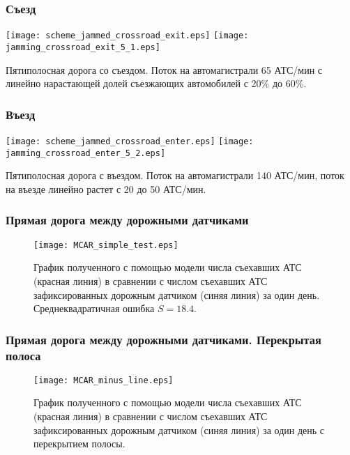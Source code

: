 \begin{frame}
    \frametitle{Съезд}
  \hfil\hfil\texttt{[image: scheme\_jammed\_crossroad\_exit.eps]}\newline
  \vfil
  \hfil\hfil\texttt{[image: jamming\_crossroad\_exit\_5\_1.eps]}\hfil\hfil
    \begin{minipage}[b][0.5\textheight][c]{.45\linewidth}
    Пятиполосная дорога со съездом. Поток на автомагистрали 65 АТС/мин с линейно нарастающей долей съезжающих автомобилей с 20\% до 60\%.
    \end{minipage}\newline
\end{frame}

\begin{frame}
    \frametitle{Въезд}
  \hfil\hfil\texttt{[image: scheme\_jammed\_crossroad\_enter.eps]}\newline
  \vfil
  \hfil\hfil\texttt{[image: jamming\_crossroad\_enter\_5\_2.eps]}\hfil\hfil
    \begin{minipage}[b][0.5\textheight][c]{.45\linewidth}
    Пятиполосная дорога с въездом. Поток на автомагистрали 140 АТС/мин, поток на въезде линейно растет с 20 до 50 АТС/мин.
    \end{minipage}\newline
\end{frame}

\begin{frame}
    \frametitle{Прямая дорога между дорожными датчиками}
    \begin{figure}[h]
        \centering
        \texttt{[image: MCAR\_simple\_test.eps]}
        \caption{График полученного с помощью модели числа съехавших АТС (красная линия) в сравнении с числом съехавших АТС зафиксированных дорожным датчиком (синяя линия) за один день. Среднеквадратичная ошибка $S = 18.4$.}
    \end{figure}
\end{frame}

\begin{frame}
    \frametitle{Прямая дорога между дорожными датчиками. Перекрытая полоса}
    \begin{figure}[ht]
        \centering
        \texttt{[image: MCAR\_minus\_line.eps]}
        \caption{График полученного с помощью модели числа съехавших АТС (красная линия) в сравнении с числом съехавших АТС зафиксированных дорожным датчиком (синяя линия) за один день с перекрытием полосы.}
    \end{figure}
\end{frame}



